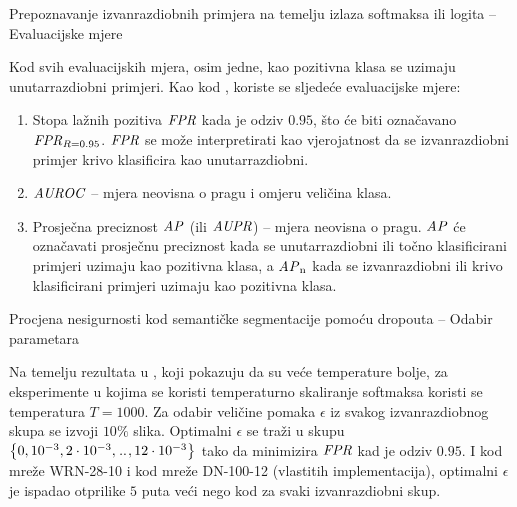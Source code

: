\documentclass{beamer}
\begin{document}
\begin{frame}[allowframebreaks=0.9]{Prepoznavanje izvanrazdiobnih primjera na temelju izlaza softmaksa ili logita -- Evaluacijske mjere}

Kod svih evaluacijskih mjera, osim jedne, kao pozitivna klasa se uzimaju unutarrazdiobni primjeri. Kao kod \citet{Liang:2017:PDOODENN}, koriste se sljedeće evaluacijske mjere:
\begin{enumerate}
	\item Stopa lažnih pozitiva $\mathit{FPR}$ kada je odziv $0.95$, što će biti označavano $\mathit{FPR}_{R=0.95}$. $\mathit{FPR}$ se može interpretirati kao vjerojatnost da se izvanrazdiobni primjer krivo klasificira kao unutarrazdiobni.
	\item $\mathit{AUROC}$ -- mjera neovisna o pragu i omjeru veličina klasa.
	\item Prosječna preciznost $\mathit{AP}$ (ili $\mathit{AUPR}$) -- mjera neovisna o pragu. $\mathit{AP}$ će označavati prosječnu preciznost kada se unutarrazdiobni ili točno klasificirani primjeri uzimaju kao pozitivna klasa, a $\mathit{AP}_\text{n}$ kada se izvanrazdiobni ili krivo klasificirani primjeri uzimaju kao pozitivna klasa.
\end{enumerate}

\end{frame}
\begin{frame}[allowframebreaks=0.9]{Procjena nesigurnosti kod semantičke segmentacije pomoću dropouta -- Odabir parametara}

Na temelju rezultata u \citet{Liang:2017:PDOODENN}, koji pokazuju da su veće temperature bolje, za eksperimente u kojima se koristi temperaturno skaliranje softmaksa koristi se temperatura $T=1000$. Za odabir veličine pomaka $\epsilon$ iz svakog izvanrazdiobnog skupa se izvoji $10\%$ slika. Optimalni $\epsilon$ se traži u skupu $\cbr{0,10^{-3},2\cdot 10^{-3},\bidot,12\cdot 10^{-3}}$ tako da minimizira $\mathit{FPR}$ kad je odziv $0.95$. I kod mreže WRN-28-10 i kod mreže DN-100-12 (vlastitih implementacija), optimalni $\epsilon$ je ispadao otprilike $5$ puta veći nego kod \citet{Liang:2017:PDOODENN} za svaki izvanrazdiobni skup.

\end{frame}
\end{document}

